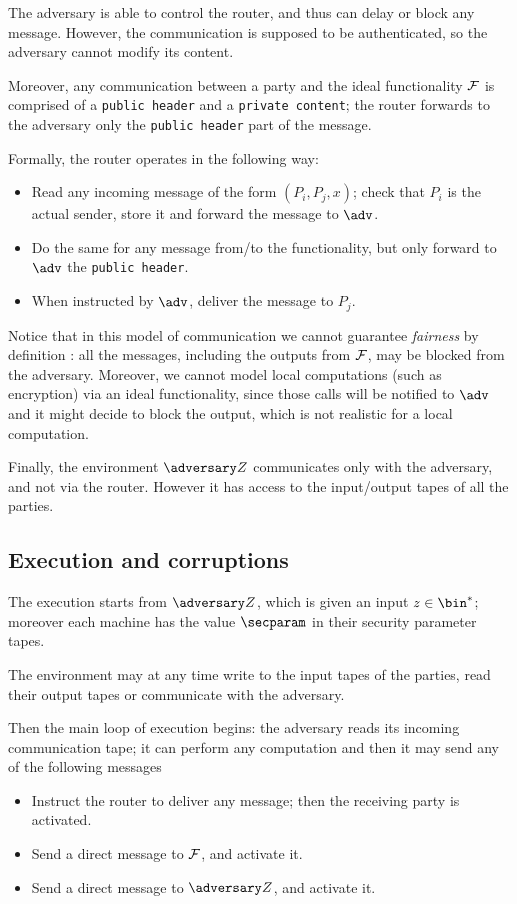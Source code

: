 The adversary is able to control the router, and thus can delay or block any message. However, the communication is supposed to be authenticated, so the adversary cannot modify its content.

Moreover, any communication between a party and the ideal functionality $\mathcal{F}$ is comprised of a \texttt{public header} and a \texttt{private content}; the router forwards to the adversary only the \texttt{public header} part of the message.

Formally, the router operates in the following way:
\begin{itemize}
    \item Read any incoming message of the form $(P_i,P_j,x)$; check that $P_i$ is the actual sender, store it and forward the message to $\adv$.
    \item Do the same for any message from/to the functionality, but only forward to $\adv$ the \texttt{public header}.
    \item When instructed by $\adv$, deliver the message to $P_j$.
\end{itemize}

Notice that in this model of communication we cannot guarantee \emph{fairness} by definition  : all the messages, including the outputs from $\mathcal{F}$, may be blocked from the adversary. Moreover, we cannot model local computations (such as encryption) via an ideal functionality, since those calls will be notified to $\adv$ and it might decide to block the output, which is not realistic for a local computation.

Finally, the environment $\zdv$ communicates only with the adversary, and not via the router. However it has access to the input/output tapes of all the parties.

\subsection{Execution and corruptions}

The execution starts from $\zdv$, which is given an input $z\in\bin^\ast$; moreover each machine has the value $\secparam$ in their security parameter tapes.

The environment may at any time write to the input tapes of the parties, read their output tapes or communicate with the adversary.

Then the main loop of execution begins: the adversary reads its incoming communication tape; it can perform any computation and then it may send any of the following messages
\begin{itemize}
    \item Instruct the router to deliver any message; then the receiving party is activated.
    \item Send a direct message to $\mathcal{F}$, and activate it.
    \item Send a direct message to $\zdv$, and activate it.
\end{itemize}

